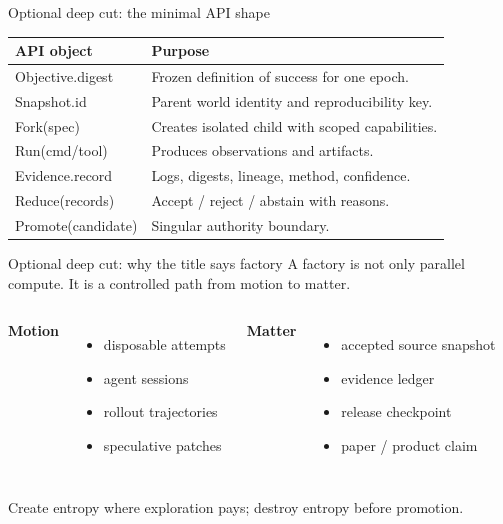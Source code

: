\begin{frame}{Optional deep cut: the minimal API shape}
\small
\begin{tabular}{p{}p{}}
\toprule
\textbf{API object} & \textbf{Purpose} \\
\midrule
Objective.digest & Frozen definition of success for one epoch. \\
Snapshot.id & Parent world identity and reproducibility key. \\
Fork(spec) & Creates isolated child with scoped capabilities. \\
Run(cmd/tool) & Produces observations and artifacts. \\
Evidence.record & Logs, digests, lineage, method, confidence. \\
Reduce(records) & Accept / reject / abstain with reasons. \\
Promote(candidate) & Singular authority boundary. \\
\bottomrule
\end{tabular}
\end{frame}

\begin{frame}{Optional deep cut: why the title says factory}
\large
A factory is not only parallel compute. It is a controlled path from motion to matter.
\vspace{0.6em}
\begin{columns}[T,onlytextwidth]
\textbf{Motion}
\begin{itemize}
  \item disposable attempts
  \item agent sessions
  \item rollout trajectories
  \item speculative patches
\end{itemize}
\textbf{Matter}
\begin{itemize}
  \item accepted source snapshot
  \item evidence ledger
  \item release checkpoint
  \item paper / product claim
\end{itemize}
\end{columns}
\vspace{0.7em}
\centering \large Create entropy where exploration pays; destroy entropy before promotion.
\end{frame}
